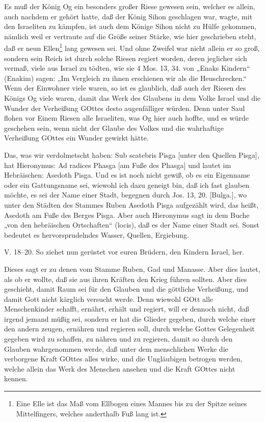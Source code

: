 Es muß der König Og ein besonders großer Riese gewesen sein, welcher es allein, auch nachdem er gehört hatte, daß der König Sihon geschlagen war, wagte, mit den Israeliten zu kämpfen, ist auch dem Könige Sihon nicht zu Hülfe gekommen, nämlich weil er vertraute auf die Größe seiner Stärke, wie hier geschrieben steht, daß er neun Ellen\footnote{Eine Elle ist das Maß vom Ellbogen eines Mannes bis zu der Spitze seines Mittelfingers, welches anderthalb Fuß lang ist.} lang gewesen sei. Und ohne Zweifel war nicht allein er so groß, sondern sein Reich ist durch solche Riesen regiert worden, deren jeglicher sich vermaß, viele aus Israel zu tödten, wie sie 4 Mos. 13, 34. von „Enaks Kindern“ (Enakim) sagen: „Im Vergleich zu ihnen erschienen wir als die Heuschrecken.“ Wenn der Einwohner viele waren, so ist es glaublich, daß auch der Riesen des Königs Og viele waren, damit das Werk des Glaubens in dem Volke Israel und die Wunder der Verheißung GOttes desto augenfälliger würden. Denn unter Saul flohen vor Einem Riesen alle Israeliten, was Og hier auch hoffte, und es würde geschehen sein, wenn nicht der Glaube des Volkes und die wahrhaftige Verheißung GOttes ein Wunder gewirkt hätte.

Das, was wir verdolmetscht haben: Sub scatebris Pisga [unter den Quellen Pisga], hat Hieronymus: Ad radices Phasga [am Fuße des Phasga] und lautet im Hebräischen: Asedoth Pisga. Und es ist noch nicht gewiß, ob es ein Eigenname oder ein Gattungsname sei, wiewohl ich dazu geneigt bin, daß ich fast glauben
möchte, es sei der Name einer Stadt, begegnen durch Jos. 13, 20. [Bulga.], wo unter den Städten des Stammes Ruben Asedoth Pisga aufgezählt wird, das heißt, Asedoth am Fuße des Berges Pisga. Aber auch Hieronymus sagt in dem Buche „von den hebräischen Ortschaften“ (locis), daß es der Name einer Stadt sei. Sonst bedeutet es hervorsprudelndes Wasser, Quellen, Ergiebung.

\begin{schriftzitat}
V. 18–20. So ziehet nun gerüstet vor euren Brüdern, den Kindern Israel, her.
\end{schriftzitat}

Dieses sagt er zu denen vom Stamme Ruben, Gad und Manasse. Aber dies lautet, als ob er wollte, daß sie aus ihren Kräften den Krieg führen sollten. Aber dies geschieht, damit Raum sei für den Glauben und die göttliche Verheißung, und damit Gott nicht kärglich versucht werde. Denn wiewohl GOtt alle Menschenkinder schafft, ernährt, erhält und regiert, will er dennoch nicht, daß irgend jemand müßig sei, sondern er hat die Glieder gegeben, durch welche einer den andern zeugen, ernähren und regieren soll, durch welche Gottes Gelegenheit gegeben wird zu schaffen, zu nähren und zu regieren, damit so durch den Glauben wahrgenommen werde, daß unter dem menschlichen Werke die verborgene Kraft GOttes alles wirke, und die Ungläubigen betrogen werden, welche allein das Werk des Menschen ansehen und die Kraft GOttes nicht kennen.

